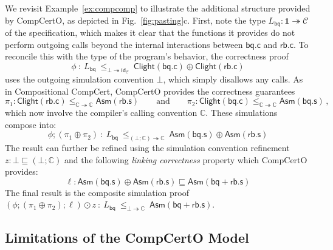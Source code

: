 \documentclass[acmsmall,screen,review,anonymous]{acmart}
\newcommand{\kw}[1]{\ensuremath{ \mathsf{#1} }}
\begin{document}
\begin{example} %
We revisit Example~\ref{ex:compcomp} to illustrate
the additional structure provided by CompCertO,
as depicted in Fig.~\ref{fig:pasting}c.
First, note the type
$L_\kw{bq} : \mathbf{1} \twoheadrightarrow \mathcal{C}$
of the specification,
which makes it clear that the functions it provides
do not perform outgoing calls beyond the internal interactions
between $\kw{bq.c}$ and $\kw{rb.c}$.
To reconcile this with the type of the program's behavior,
the correctness proof
\[
  \phi \::\: L_\kw{bq} \:\le_{\bot \twoheadrightarrow \kw{id}_\mathcal{C}}\:
    \kw{Clight}(\kw{bq.c}) \oplus \kw{Clight}(\kw{rb.c})
\]
uses the outgoing simulation convention $\bot$,
which simply disallows any calls.
As in Compositional CompCert,
CompCertO provides the correctness guarantees
\[
  \pi_1 : \kw{Clight}(\kw{rb.c}) \le_{\mathbb{C} \twoheadrightarrow \mathbb{C}}
           \kw{Asm}(\kw{rb.s})
  \qquad \text{and} \qquad
  \pi_2 : \kw{Clight}(\kw{bq.c}) \le_{\mathbb{C} \twoheadrightarrow \mathbb{C}}
           \kw{Asm}(\kw{bq.s})
  \,,
\]
which now involve the compiler's calling convention $\mathbb{C}$.
These simulations compose into:
\[
  \phi \mathbin; (\pi_1 \oplus \pi_2) \::\:
  L_\kw{bq}
   \:\le_{(\bot \mathbin; \mathbb{C}) \twoheadrightarrow \mathbb{C}}\:
    \kw{Asm}(\kw{bq.s}) \oplus \kw{Asm}(\kw{rb.s})
\]
The result can further be refined using the simulation convention refinement
$z : \bot \sqsubseteq (\bot\mathbin;\mathbb{C})$
and the following \emph{linking correctness} property which CompCertO provides:
\[
  \ell :
  \kw{Asm}(\kw{bq.s}) \oplus \kw{Asm}(\kw{rb.s}) \sqsubseteq
  \kw{Asm}(\kw{bq+rb.s})
\]
The final result is the composite simulation proof
$(\phi \mathbin; (\pi_1 \oplus \pi_2) \mathbin; \ell) \odot z \::\:
 L_\kw{bq} \:\le_{\bot \twoheadrightarrow \mathbb{C}}\:
 \kw{Asm}(\kw{bq+rb.s})$.
\end{example}


\subsection{Limitations of the CompCertO Model} %
\end{document}
